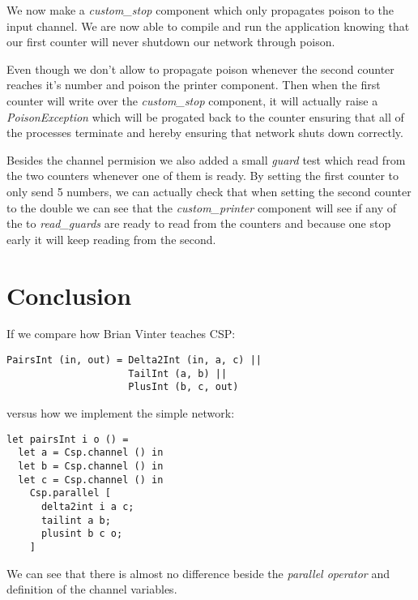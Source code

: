 \documentclass[a4paper,12pt]{article}
\begin{document}
We now make a {\it custom\_stop} component which only propagates poison to
the input channel. We are now able to compile and run the application knowing
that our first counter will never shutdown our network through poison.

Even though we don't allow to propagate poison whenever the second counter
reaches it's number and poison the printer component. Then when the first
counter will write over the {\it custom\_stop} component, it will actually
raise a {\it PoisonException} which will be progated back to the counter
ensuring that all of the processes terminate and hereby ensuring that network
shuts down correctly.

Besides the channel permision we also added a small {\it guard} test which read
from the two counters whenever one of them is ready. By setting the first
counter to only send 5 numbers, we can actually check that when setting the
second counter to the double we can see that the {\it custom\_printer} component
will see if any of the to {\it read\_guards} are ready to read from the counters
and because one stop early it will keep reading from the second.


\section{Conclusion}
\label{conclusion}

If we compare how Brian Vinter teaches CSP\cite{vintercsp}:
\begin{center}
\begin{verbatim}
PairsInt (in, out) = Delta2Int (in, a, c) || 
                     TailInt (a, b) || 
                     PlusInt (b, c, out) 
\end{verbatim}
\end{center}

versus how we implement the simple network:

\begin{verbatim}
let pairsInt i o () =
  let a = Csp.channel () in
  let b = Csp.channel () in
  let c = Csp.channel () in
    Csp.parallel [
      delta2int i a c;
      tailint a b;
      plusint b c o;
    ]
\end{verbatim}

We can see that there is almost no difference beside the {\it parallel operator}
and definition of the channel variables.
\end{document}
